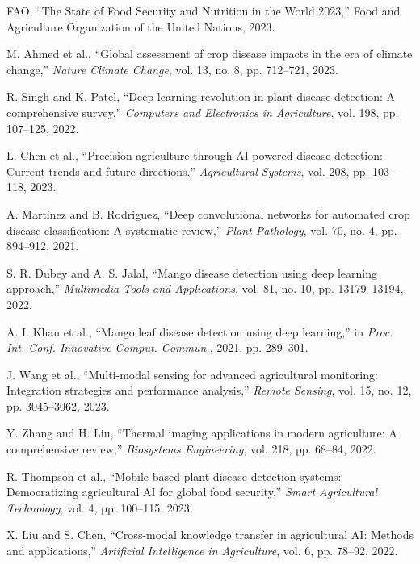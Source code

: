 \documentclass[conference]{IEEEtran}
\begin{document}
\begin{thebibliography}{00}
FAO, ``The State of Food Security and Nutrition in the World 2023,'' Food and Agriculture Organization of the United Nations, 2023.

M. Ahmed et al., ``Global assessment of crop disease impacts in the era of climate change,'' \textit{Nature Climate Change}, vol. 13, no. 8, pp. 712--721, 2023.

R. Singh and K. Patel, ``Deep learning revolution in plant disease detection: A comprehensive survey,'' \textit{Computers and Electronics in Agriculture}, vol. 198, pp. 107--125, 2022.

L. Chen et al., ``Precision agriculture through AI-powered disease detection: Current trends and future directions,'' \textit{Agricultural Systems}, vol. 208, pp. 103--118, 2023.

A. Martinez and B. Rodriguez, ``Deep convolutional networks for automated crop disease classification: A systematic review,'' \textit{Plant Pathology}, vol. 70, no. 4, pp. 894--912, 2021.

S. R. Dubey and A. S. Jalal, ``Mango disease detection using deep learning approach,'' \textit{Multimedia Tools and Applications}, vol. 81, no. 10, pp. 13179--13194, 2022.

A. I. Khan et al., ``Mango leaf disease detection using deep learning,'' in \textit{Proc. Int. Conf. Innovative Comput. Commun.}, 2021, pp. 289--301.

J. Wang et al., ``Multi-modal sensing for advanced agricultural monitoring: Integration strategies and performance analysis,'' \textit{Remote Sensing}, vol. 15, no. 12, pp. 3045--3062, 2023.

Y. Zhang and H. Liu, ``Thermal imaging applications in modern agriculture: A comprehensive review,'' \textit{Biosystems Engineering}, vol. 218, pp. 68--84, 2022.

R. Thompson et al., ``Mobile-based plant disease detection systems: Democratizing agricultural AI for global food security,'' \textit{Smart Agricultural Technology}, vol. 4, pp. 100--115, 2023.

X. Liu and S. Chen, ``Cross-modal knowledge transfer in agricultural AI: Methods and applications,'' \textit{Artificial Intelligence in Agriculture}, vol. 6, pp. 78--92, 2022.


\end{thebibliography}
\end{document}
